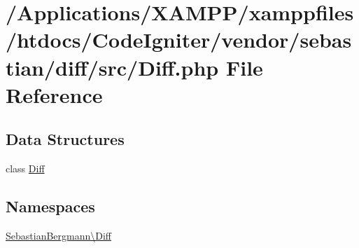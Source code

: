 \hypertarget{_diff_8php}{}\section{/\+Applications/\+X\+A\+M\+P\+P/xamppfiles/htdocs/\+Code\+Igniter/vendor/sebastian/diff/src/\+Diff.php File Reference}
\label{_diff_8php}
\subsection*{Data Structures}
\begin{DoxyCompactItemize}
\item 
class \mbox{\hyperlink{class_sebastian_bergmann_1_1_diff_1_1_diff}{Diff}}
\end{DoxyCompactItemize}
\subsection*{Namespaces}
\begin{DoxyCompactItemize}
\item 
 \mbox{\hyperlink{namespace_sebastian_bergmann_1_1_diff}{Sebastian\+Bergmann\textbackslash{}\+Diff}}
\end{DoxyCompactItemize}
